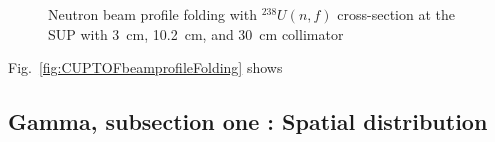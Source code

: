 \documentclass[12pt,journal]{IEEEtran}
\let\MYoriglatexcaption\caption
\renewcommand{\caption}[2][\relax]{\MYoriglatexcaption[#2]{#2}}
\begin{document}
\begin{figure}[!t] 
	\centering    
	\hfill
	\hfill
	\caption{Neutron beam profile folding with $^{238}U(n,f)$ cross-section at the SUP with \SI{3}{\cm}, \SI{10.2}{\cm}, and \SI{30}{\cm} collimator} 
	\label{fig:SUPbeamprofileFolding}
\end{figure}

Fig.~\ref{fig:CUPTOFbeamprofileFolding} shows


\subsection{Gamma, subsection one : Spatial distribution}
\end{document}
